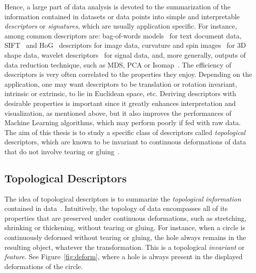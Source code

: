 Hence, a large part of data analysis is devoted to the summarization 
of the information contained in datasets or data points into simple and 
interpretable {\em descriptors} or {\em signatures}, which are usually application specific. 
For instance, among common descriptors are: 
bag-of-words models~\cite{Soumya14} for text document data,
SIFT~\cite{Lowe04} and HoG~\cite{Dalal05} descriptors for image data,
curvature and spin images~\cite{Johnson99} for 3D shape data,
wavelet descriptors~\cite{Mallat08} for signal data,
and, more generally, outputs of data reduction technique, such as MDS, PCA or Isomap~\cite{Tenenbaum00}.
The efficiency of descriptors is very often correlated to the properties they enjoy. Depending on the application,
one may want descriptors  to be translation or rotation invariant, intrinsic or extrinsic, to lie in Euclidean space, etc.
Deriving descriptors with desirable properties is important since it greatly enhances interpretation and visualization, as mentioned above,
but it also improves the performances of Machine Learning algorithms, which may perform poorly if fed with raw data.
The aim of this thesis is to study a specific class of descriptors called {\em topological} descriptors, which are known to be 
invariant to continuous deformations of data that do not involve tearing or gluing~\cite{Carlsson09a}. 

\subsection{Topological Descriptors}

The idea of topological descriptors is to summarize the {\em topological information} contained in data~\cite{Carlsson09a}.
Intuitively, the topology of data encompasses all of its properties that are preserved under continuous deformations, such as stretching, shrinking
or thickening, without tearing or gluing. For instance, %
when a circle is continuously deformed without tearing or gluing, the hole always remains in the resulting object, whatever the transformation.
This is a topological {\em invariant} or {\em feature}. See Figure~\ref{fig:deform},
where a hole is always present in the displayed deformations of the circle.


